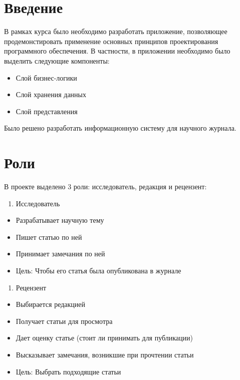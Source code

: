 \section{Введение}\label{ux432ux432ux435ux434ux435ux43dux438ux435}

В рамках курса было необходимо разработать приложение, позволяющее
продемонстировать применение основных принципов проектирования
программного обеспечения. В частности, в приложении необходимо было
выделить следующие компоненты:

\begin{itemize}
\tightlist
\item
  Слой бизнес-логики
\item
  Слой хранения данных
\item
  Слой представления
\end{itemize}

Было решено разработать информационную систему для научного журнала.

\section{Роли}\label{ux440ux43eux43bux438}

В проекте выделено 3 роли: исследователь, редакция и рецензент:

\begin{enumerate}
\def\labelenumi{\arabic{enumi}.}
\tightlist
\item
  Исследователь
\end{enumerate}

\begin{itemize}
\tightlist
\item
  Разрабатывает научную тему
\item
  Пишет статью по ней
\item
  Принимает замечания по ней
\item
  Цель: Чтобы его статья была опубликована в журнале
\end{itemize}

\begin{enumerate}
\def\labelenumi{\arabic{enumi}.}
\setcounter{enumi}{1}
\tightlist
\item
  Рецензент
\end{enumerate}

\begin{itemize}
\tightlist
\item
  Выбирается редакцией
\item
  Получает статьи для просмотра
\item
  Дает оценку статье (стоит ли принимать для публикации)
\item
  Высказывает замечания, возникшие при прочтении статьи
\item
  Цель: Выбрать подходящие статьи
\end{itemize}

